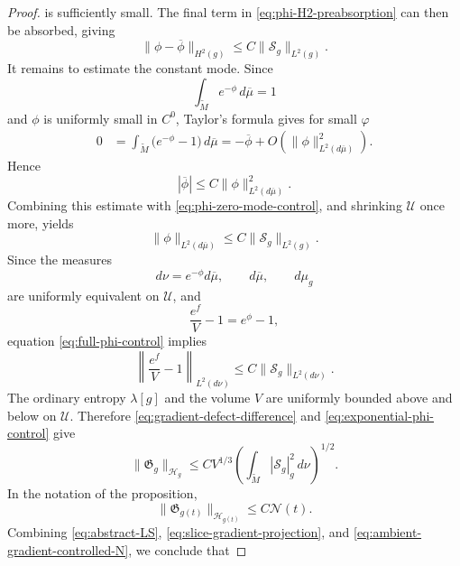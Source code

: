 \documentclass{amsart}
\begin{document}
\begin{proof}
is sufficiently small. The final term in
\eqref{eq:phi-H2-preabsorption} can then be absorbed, giving
\begin{equation}
\label{eq:phi-zero-mode-control}
        \|\phi-\overline\phi\|_{H^2(g)}
        \leq
        C\|\mathcal S_g\|_{L^2(g)}.
\end{equation}
It remains to estimate the constant mode. Since
\[
        \int_{\widetilde M}e^{-\phi}\,d\overline\mu=1
\]
and \(\phi\) is uniformly small in \(C^0\), Taylor's formula gives for small $\varphi$
\[
\begin{aligned}
        0
        &=
        \int_{\widetilde M}
        \bigl(e^{-\phi}-1\bigr)\,d\overline\mu=
        -\overline\phi
        +
        O\left(
        \|\phi\|_{L^2(d\overline\mu)}^2
        \right).
\end{aligned}
\]
Hence
\[
        |\overline\phi|
        \leq
        C\|\phi\|_{L^2(d\overline\mu)}^2.
\]
Combining this estimate with
\eqref{eq:phi-zero-mode-control}, and shrinking \(\mathcal U\) once
more, yields
\begin{equation}
\label{eq:full-phi-control}
        \|\phi\|_{L^2(d\overline\mu)}
        \leq
        C\|\mathcal S_g\|_{L^2(g)}.
\end{equation}
Since the measures
\[
        d\nu=e^{-\phi}d\overline\mu,
        \qquad
        d\overline\mu,
        \qquad
        d\mu_g
\]
are uniformly equivalent on \(\mathcal U\), and
\[
        \frac{e^f}{V}-1=e^\phi-1,
\]
equation \eqref{eq:full-phi-control} implies
\begin{equation}
\label{eq:exponential-phi-control}
        \left\|
        \frac{e^f}{V}-1
        \right\|_{L^2(d\nu)}
        \leq
        C
        \|\mathcal S_g\|_{L^2(d\nu)}.
\end{equation}
The ordinary entropy \(\lambda[g]\) and the volume \(V\) are uniformly
bounded above and below on \(\mathcal U\). Therefore
\eqref{eq:gradient-defect-difference} and
\eqref{eq:exponential-phi-control} give
\[
        \|\mathfrak G_g\|_{\mathcal H_g}
        \leq
        C V^{1/3}
        \left(
        \int_{\widetilde M}
        |\mathcal S_g|_g^2\,d\nu
        \right)^{1/2}.
\]
In the notation of the proposition,
\begin{equation}
\label{eq:ambient-gradient-controlled-N}
        \|\mathfrak G_{g(t)}\|_{\mathcal H_{g(t)}}
        \leq
        C\mathcal N(t).
\end{equation}
Combining \eqref{eq:abstract-LS},
\eqref{eq:slice-gradient-projection}, and
\eqref{eq:ambient-gradient-controlled-N}, we conclude that

\end{proof}
\end{document}

